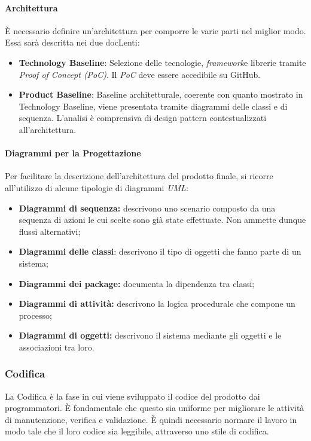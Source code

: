 \paragraph{Architettura}
È necessario definire un'architettura per comporre le varie parti nel miglior modo. Essa sarà descritta nei due docLenti:
\begin{itemize}
  \item \textbf{Technology Baseline}: Selezione delle tecnologie, \textit{framework}\glo e librerie tramite \textit{Proof of Concept (PoC)\glos}. Il \textit{PoC\glo} deve essere accedibile su GitHub.
  \item \textbf{Product Baseline}: Baseline architetturale, coerente con quanto mostrato in Technology Baseline, viene presentata tramite diagrammi delle classi e di sequenza. L'analisi è comprensiva di design pattern contestualizzati all'architettura.
\end{itemize}
\paragraph{Diagrammi per la Progettazione}
Per facilitare la descrizione dell'architettura del prodotto finale, si ricorre all'utilizzo di alcune tipologie di diagrammi \textit{UML\glo}:
\begin{itemize}
	\item \textbf{Diagrammi di sequenza:} descrivono uno scenario composto da una sequenza di azioni le cui scelte sono già state effettuate. Non ammette dunque flussi alternativi;
	\item \textbf{Diagrammi delle classi}: descrivono il tipo di oggetti che fanno parte di un sistema;
	\item \textbf{Diagrammi dei package:} documenta la dipendenza tra classi;
	\item \textbf{Diagrammi di attività:} descrivono la logica procedurale che compone un processo;
	\item \textbf{Diagrammi di oggetti:} descrivono il sistema mediante gli oggetti e le associazioni tra loro.
\end{itemize}
\subsubsection{Codifica}
La Codifica è la fase in cui viene sviluppato il codice del prodotto dai programmatori. È fondamentale che questo sia uniforme per migliorare le attività di manutenzione, verifica e validazione. È quindi necessario normare il lavoro in modo tale che il loro codice sia leggibile, attraverso uno stile di codifica.
